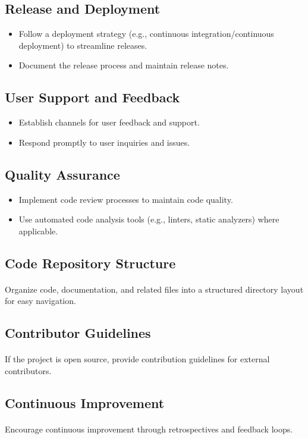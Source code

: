 \documentclass{article}
\begin{document}
\subsection{Release and Deployment}
\begin{itemize}
    \item Follow a deployment strategy (e.g., continuous integration/continuous
        deployment) to streamline releases.
    \item Document the release process and maintain release notes.
\end{itemize}

\subsection{User Support and Feedback}
\begin{itemize}
    \item Establish channels for user feedback and support.
    \item Respond promptly to user inquiries and issues.
\end{itemize}

\subsection{Quality Assurance}
\begin{itemize}
    \item Implement code review processes to maintain code quality.
    \item Use automated code analysis tools (e.g., linters, static analyzers) where applicable.
\end{itemize}

\subsection{Code Repository Structure}
\paragraph{}
Organize code, documentation, and related files into a structured directory layout for easy navigation.

\subsection{Contributor Guidelines}
\paragraph{}
If the project is open source, provide contribution guidelines for external contributors.

\subsection{Continuous Improvement}
\paragraph{}
Encourage continuous improvement through retrospectives and feedback loops.
\end{document}
